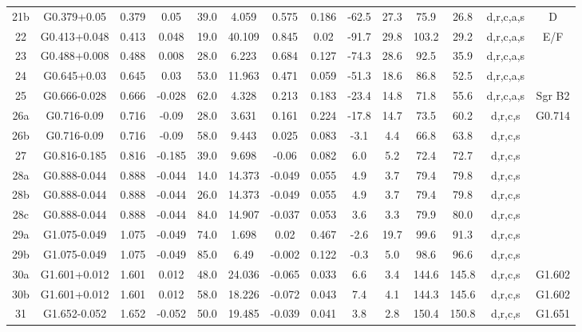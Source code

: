 \begin{table}
\begin{tabular}{cccccccccccccc}
21b & G0.379+0.05 & 0.379 & 0.05 & 39.0 & 4.059 & 0.575 & 0.186 & -62.5 & 27.3 & 75.9 & 26.8 & d,r,c,a,s & D \\
22 & G0.413+0.048 & 0.413 & 0.048 & 19.0 & 40.109 & 0.845 & 0.02 & -91.7 & 29.8 & 103.2 & 29.2 & d,r,c,a,s & E/F \\
23 & G0.488+0.008 & 0.488 & 0.008 & 28.0 & 6.223 & 0.684 & 0.127 & -74.3 & 28.6 & 92.5 & 35.9 & d,r,c,a,s &  \\
24 & G0.645+0.03 & 0.645 & 0.03 & 53.0 & 11.963 & 0.471 & 0.059 & -51.3 & 18.6 & 86.8 & 52.5 & d,r,c,a,s &  \\
25 & G0.666-0.028 & 0.666 & -0.028 & 62.0 & 4.328 & 0.213 & 0.183 & -23.4 & 14.8 & 71.8 & 55.6 & d,r,c,a,s & Sgr B2 \\
26a & G0.716-0.09 & 0.716 & -0.09 & 28.0 & 3.631 & 0.161 & 0.224 & -17.8 & 14.7 & 73.5 & 60.2 & d,r,c,s & G0.714 \\
26b & G0.716-0.09 & 0.716 & -0.09 & 58.0 & 9.443 & 0.025 & 0.083 & -3.1 & 4.4 & 66.8 & 63.8 & d,r,c,s &  \\
27 & G0.816-0.185 & 0.816 & -0.185 & 39.0 & 9.698 & -0.06 & 0.082 & 6.0 & 5.2 & 72.4 & 72.7 & d,r,c,s &  \\
28a & G0.888-0.044 & 0.888 & -0.044 & 14.0 & 14.373 & -0.049 & 0.055 & 4.9 & 3.7 & 79.4 & 79.8 & d,r,c,s &  \\
28b & G0.888-0.044 & 0.888 & -0.044 & 26.0 & 14.373 & -0.049 & 0.055 & 4.9 & 3.7 & 79.4 & 79.8 & d,r,c,s &  \\
28c & G0.888-0.044 & 0.888 & -0.044 & 84.0 & 14.907 & -0.037 & 0.053 & 3.6 & 3.3 & 79.9 & 80.0 & d,r,c,s &  \\
29a & G1.075-0.049 & 1.075 & -0.049 & 74.0 & 1.698 & 0.02 & 0.467 & -2.6 & 19.7 & 99.6 & 91.3 & d,r,c,s &  \\
29b & G1.075-0.049 & 1.075 & -0.049 & 85.0 & 6.49 & -0.002 & 0.122 & -0.3 & 5.0 & 98.6 & 96.6 & d,r,c,s &  \\
30a & G1.601+0.012 & 1.601 & 0.012 & 48.0 & 24.036 & -0.065 & 0.033 & 6.6 & 3.4 & 144.6 & 145.8 & d,r,c,s & G1.602 \\
30b & G1.601+0.012 & 1.601 & 0.012 & 58.0 & 18.226 & -0.072 & 0.043 & 7.4 & 4.1 & 144.3 & 145.6 & d,r,c,s & G1.602 \\
31 & G1.652-0.052 & 1.652 & -0.052 & 50.0 & 19.485 & -0.039 & 0.041 & 3.8 & 2.8 & 150.4 & 150.8 & d,r,c,s & G1.651 \\
\end{tabular}
\end{table}
